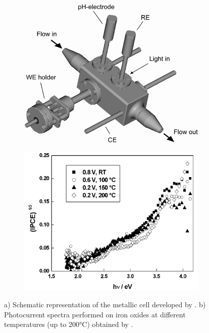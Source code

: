     \renewcommand{\coef}{0.45}
    \begin{figure}[h]
        \centering
        \begin{subfigure}{\coef\textwidth}
            \centering
            \includegraphics[width=\textwidth]{./src/figures/Bojinov_2002_Fig1.png}
            \caption{}
            \label{fig_bojinov_ht_a}
        \end{subfigure}
        \begin{subfigure}{\coef\textwidth}
            \centering
            \includegraphics[width=\textwidth]{./src/figures/Bojinov_2002_Fig5b.png}
            \caption{}
            \label{fig_bojinov_ht_b}
        \end{subfigure}
        
        \caption{a) Schematic representation of the metallic cell developed
        by \citet{bojinov2002}. 
        b) Photocurrent spectra performed on iron oxides at different 
        temperatures (up to 200°C) obtained by \citet{bojinov2002}.}
        \label{fig_bojinov_ht}
    \end{figure}



